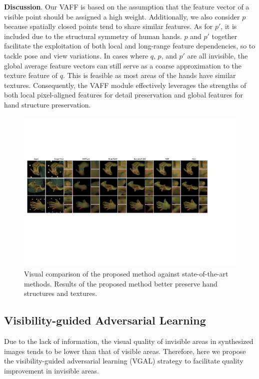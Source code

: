 \documentclass[letterpaper]{article}
\begin{document}
\textbf{Discussion}. Our VAFF is based on the assumption that the feature vector of a visible point should be assigned a high weight. Additionally, we also consider $p$ because spatially closed points tend to share similar features. As for $p'$, it is included due to the structural symmetry of human hands. $p$ and $p'$ together facilitate the exploitation of both local and long-range feature dependencies, so to tackle pose and view variations. In cases where $q$, $p$, and $p'$ are all invisible, the global average feature vectors can still serve as a coarse approximation to the texture feature of $q$. This is feasible as most areas of the hands have similar textures. Consequently, the VAFF module effectively leverages the strengths of both local pixel-aligned features for detail preservation and global features for hand structure preservation.

\begin{figure}[t]
  \centering
  \includegraphics[width=1.0\hsize]{figures/quality.pdf}
  \caption{Visual comparison of the proposed method against state-of-the-art methods. Results of the proposed method better preserve hand structures and textures.}
  \label{fig:quality}
\end{figure}

\subsection{Visibility-guided Adversarial Learning}
\label{sec:dis}

Due to the lack of information, the visual quality of invisible areas in synthesized images tends to be lower than that of visible areas. Therefore, here we propose the visibility-guided adversarial learning (VGAL) strategy to facilitate quality improvement in invisible areas.
\end{document}
